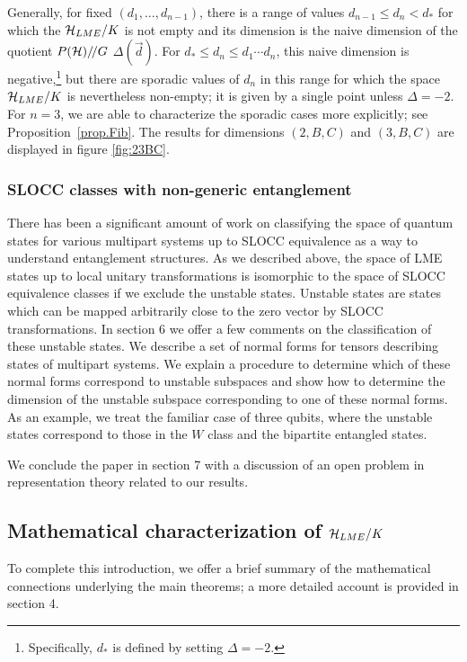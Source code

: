 \documentclass[12pt]{article}
\theoremstyle{definition}
\newcommand{\GITquot}{/\!/}
\begin{document}
Generally, for fixed
$(d_1,\dots, d_{n-1})$, there is a range of values $d_{n-1} \le d_n <
d_*$ for which the ${\cal H}_{LME}/K$ is not empty and its dimension
is the naive dimension of the quotient $P({\cal H})\GITquot G$ $\Delta(\vec{d})$. For $d_* \le d_n \le d_1 \cdots d_n$,
this naive dimension is negative,\footnote{Specifically, $d_*$ is
defined by setting $\Delta = -2$.} but there are sporadic values of
$d_n$ in this range for which the space ${\cal H}_{LME}/K$ is
nevertheless non-empty; it is given by a single point unless $\Delta =
-2$. For $n=3$, we are able to characterize the sporadic cases more explicitly; see Proposition~\ref{prop.Fib}.
The results for dimensions $(2,B,C)$ and $(3,B,C)$ are displayed in figure \ref{fig:23BC}.

\subsubsection{SLOCC classes with non-generic entanglement}

There has been a significant amount of work on classifying the space of quantum states for various multipart systems up to SLOCC equivalence as a way to understand entanglement structures. As we described above, the space of LME states up to local unitary transformations is isomorphic to the space of SLOCC equivalence classes if we exclude the unstable states. Unstable states are states which can be mapped arbitrarily close to the zero vector by SLOCC transformations. In section 6 we offer a few comments on the classification of these  unstable states. We describe a set of normal forms for tensors describing states of multipart systems. We explain a procedure to determine which of these normal forms correspond to unstable subspaces and show how to determine the dimension of the unstable subspace corresponding to one of these normal forms. As an example, we treat the familiar case of three qubits, where the unstable states correspond to those in the $W$ class and the bipartite entangled states.

We conclude the paper in section 7 with a discussion of an open problem in representation theory related to our results.

\subsection{Mathematical characterization of ${\cal H}_{LME}/K$}

To complete this introduction, we offer a brief summary of the mathematical connections underlying the main theorems; a more detailed account is provided in section 4.
\end{document}
